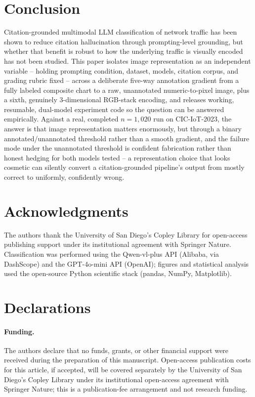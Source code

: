 \documentclass[twocolumn]{svjour3}
\begin{document}
\section{Conclusion}

Citation-grounded multimodal LLM classification of network traffic has been shown to reduce
citation hallucination through prompting-level grounding, but whether that benefit is robust to how
the underlying traffic is visually encoded has not been studied. This paper isolates image
representation as an independent variable -- holding prompting condition, dataset, models, citation
corpus, and grading rubric fixed -- across a deliberate five-way annotation gradient from a fully
labeled composite chart to a raw, unannotated numeric-to-pixel image, plus a sixth, genuinely
3-dimensional RGB-stack encoding, and releases working, resumable, dual-model experiment code so the
question can be answered empirically. Against a real, completed $n=1{,}020$ run on CIC-IoT-2023, the
answer is that image representation matters enormously, but through a binary annotated/unannotated
threshold rather than a smooth gradient, and the failure mode under the unannotated threshold is
confident fabrication rather than honest hedging for both models tested -- a representation choice
that looks cosmetic can silently convert a citation-grounded pipeline's output from mostly correct to
uniformly, confidently wrong.

\section*{Acknowledgments}

The authors thank the University of San Diego's Copley Library for open-access publishing support
under its institutional agreement with Springer Nature. Classification was performed using the
Qwen-vl-plus API (Alibaba, via DashScope) and the GPT-4o-mini API (OpenAI); figures and statistical
analysis used the open-source Python scientific stack (pandas, NumPy, Matplotlib).

\section*{Declarations}

\paragraph{Funding.} The authors declare that no funds, grants, or other financial support were
received during the preparation of this manuscript. Open-access publication costs for this article,
if accepted, will be covered separately by the University of San Diego's Copley Library under its
institutional open-access agreement with Springer Nature; this is a publication-fee arrangement and
not research funding.
\end{document}
